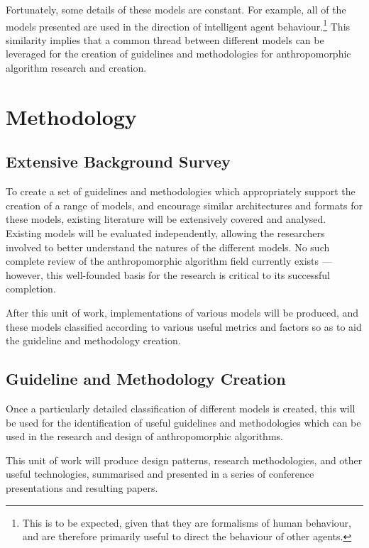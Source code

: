 Fortunately, some details of these models are constant. For example, all of the models presented are used in the direction of intelligent agent behaviour.\footnote{This is to be expected, given that they are formalisms of human behaviour, and are therefore primarily useful to direct the behaviour of other agents.} This similarity implies that a common thread between different models can be leveraged for the creation of guidelines and methodologies for anthropomorphic algorithm research and creation.\par

\section{Methodology}
\label{sec:methodology}

\subsection{Extensive Background Survey}
To create a set of guidelines and methodologies which appropriately support the creation of a range of models, and encourage similar architectures and formats for these models, existing literature will be extensively covered and analysed. Existing models will be evaluated independently, allowing the researchers involved to better understand the natures of the different models. No such complete review of the anthropomorphic algorithm field currently exists --- however, this well-founded basis for the research is critical to its successful completion.\par

After this unit of work, implementations of various models will be produced, and these models classified according to various useful metrics and factors so as to aid the guideline and methodology creation.

\subsection{Guideline and Methodology Creation}
Once a particularly detailed classification of different models is created, this will be used for the identification of useful guidelines and methodologies which can be used in the research and design of anthropomorphic algorithms.\par

This unit of work will produce design patterns, research methodologies, and other useful technologies, summarised and presented in a series of conference presentations and resulting papers.\par

